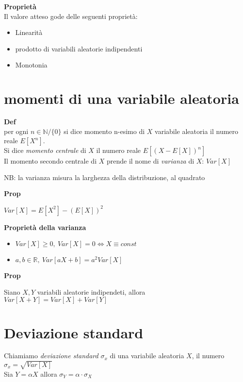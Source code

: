 \documentclass[12pt, a4paper]{article}
\begin{document}
\textbf{Proprietà}\\ Il valore atteso gode delle seguenti proprietà:
\begin{itemize}
    \item Linearità
    \item prodotto di variabili aleatorie indipendenti
    \item Monotonia
\end{itemize}

\section{momenti di una variabile aleatoria}

\textbf{Def}\\ per ogni $n\in\mathbb{N}/\{0\}$ si dice momento n-esimo di $X$ variabile aleatoria il 
numero reale $E[X^{n}]$.\\ Si dice \textit{momento centrale} di $X$ il numero reale $E[(X-E[X])^{n}]$\\
Il momento secondo centrale di $X$ prende il nome di \textit{varianza} di $X$: $Var[X]$

NB: la varianza misura la larghezza della distribuzione, al quadrato

\textbf{Prop}
\begin{center}
     $Var[X]=E[X^{2}]-(E[X])^{2}$
\end{center}

\textbf{Proprietà della varianza}
\begin{itemize}
    \item $Var[X]\geq0,\ Var[X]=0 \Leftrightarrow X\equiv const$
    \item $a,b\in\mathbb{R},\ Var[aX+b]=a^{2}Var[X]$
\end{itemize}

\textbf{Prop} 
\begin{center}
    Siano $X,Y$ variabili aleatorie indipendeti, allora $Var[X+Y]=Var[X]+Var[Y]$
\end{center}

\newpage
\section{Deviazione standard}
Chiamiamo \textit{deviazione standard} $\sigma_{x}$ di una variabile aleatoria $X$, il 
numero $\sigma_{x}=\sqrt{Var[X]}$\\
Sia $Y=\alpha X$ allora $\sigma_{Y}=\alpha\cdot\sigma_{X}$
\end{document}
